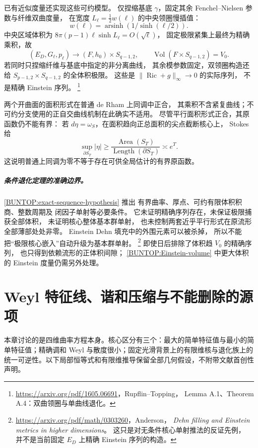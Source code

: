 \documentclass[UTF8,fontset=fandol,zihao=-4,oneside,openany]{ctexbook}
\theoremstyle{cjkplain}
\numberwithin{equation}{chapter}
\begin{document}
已有近似度量还实现这些可约模型。
仅捏缩基底 \(\gamma\)，固定其余 Fenchel--Nielsen 参数与纤维双曲度量，
在宽度 \(L_\ell=\frac12w(\ell)\) 的中央领圈慢插值：
\[
 w(\ell)=\operatorname{arsinh}(1/\sinh(\ell/2)).
\]
中央区域体积为
\(8\pi(p-1)\ell\sinh L_\ell=O(\sqrt\ell)\)，
固定极限紧集上最终为精确乘积，故
\begin{equation}
 (E_D,G_\ell,p_\ell)\longrightarrow
 (F,h_0)\times S_{q-1,2},\qquad
 \operatorname{Vol}(F\times S_{q-1,2})=V_0 .
 \label{BUNTOP:actual-full-volume-limit}
\end{equation}
若同时只捏缩纤维与基底中指定的非分离曲线，
其余模参数固定，双领圈构造还给
\(S_{p-1,2}\times S_{q-1,2}\) 的全体积极限。
这些是 \(\|\operatorname{Ric}+g\|_\infty\to0\) 的实际序列，
不是精确 Einstein 序列。%
\footnote{\url{https://arxiv.org/pdf/1605.06691}，Rupflin--Topping，
Lemma A.1、Theorem A.4：双曲领圈与单曲线退化。}

两个开曲面的面积形式在普通 de Rham 上同调中正合，
其乘积不含紧复曲线；不可约分支使用的正自交曲线机制在此确实不适用。
尽管平行面积形式正合，其原函数仍不能有界：
若 \(d\eta=\omega_S\)，在面积趋向正总面积的尖点截断核心上，
Stokes 给
\[
 \sup_{\partial S_T}|\eta|
 \ge \frac{\operatorname{Area}(S_T)}
          {\operatorname{Length}(\partial S_T)}
 \asymp e^T .
\]
这说明普通上同调为零不等于存在可供全局估计的有界原函数。

\paragraph{条件退化定理的准确边界。}
\eqref{BUNTOP:exact-sequence-hypothesis} 推出
有界曲率、厚点、可约有限体积积商、整数周期及
闭因子单射等必要条件。
它未证明精确序列存在，未保证极限捕获全部体积，
未证明核心整体基本群单射，
也未控制两套近乎平行形式在原流形全部薄部处处非零。
Einstein Dehn 填充中的外围元素可以被杀掉，
所以不能把“极限核心嵌入”自动升级为基本群单射。%
\footnote{\url{https://arxiv.org/pdf/math/0303260}，Anderson，
\emph{Dehn filling and Einstein metrics in higher dimensions}。
这只是对无条件核心单射推法的反证先例，
并不是当前固定 \(E_D\) 上精确 Einstein 序列的构造。}
即使日后排除了体积趋 \(V_0\) 的精确序列，
也只得到依赖流形的正体积间隙；
\eqref{BUNTOP:Einstein-volume} 中更大体积的 Einstein 度量仍需另外处理。


\chapter{Weyl 特征线、谐和压缩与不能删除的源项}\label{WYL:chapter}
本章讨论的是四维曲率方程本身。核心区分有三个：最大的简单特征值与最小的简单特征值；精确调和 Weyl 与散度很小；固定光滑背景上的有限维核与退化族上的统一可逆性。以下局部恒等式和有限维推导保留全部几何假设，不附带文献首创性声明。
\end{document}
